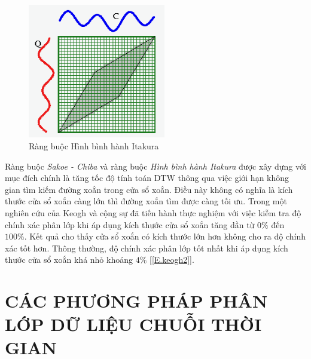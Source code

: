 \documentclass[13pt,oneside]{scrbook}
\begin{document}
\begin{figure}[H]
	\begin{center}
		\includegraphics[width=60mm]{Itakura.png}
		\caption{Ràng buộc Hình bình hành Itakura}
		\label{Itakura.png}
	\end{center}
\end{figure}

Ràng buộc \textit{Sakoe - Chiba} và ràng buộc \textit{Hình bình hành Itakura} được xây dựng với mục đích chính là tăng tốc độ tính toán DTW thông qua việc giới hạn không gian tìm kiếm đường xoắn trong cửa sổ xoắn.
Điều này không có nghĩa là kích thước cửa sổ xoắn càng lớn thì đường xoắn tìm được càng tối ưu.
Trong một nghiên cứu của Keogh và cộng sự đã tiến hành thực nghiệm với việc kiễm tra độ chính xác phân lớp khi áp dụng kích thước cửa sổ xoắn tăng dần từ $0\%$ đến $100\%$.
Kết quả cho thấy cửa sổ xoắn có kích thước lớn hơn không cho ra độ chính xác tốt hơn.
Thông thường, độ chính xác phân lớp tốt nhất khi áp dụng kích thước cửa sổ xoắn khá nhỏ khoảng $4\%$ [\ref{E.keogh2}].
\section{CÁC PHƯƠNG PHÁP PHÂN LỚP DỮ LIỆU CHUỖI THỜI GIAN}
\end{document}
